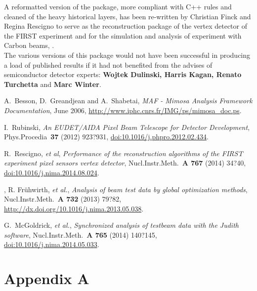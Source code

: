 \documentclass[a4paper, 12pt, twoside]{article}
\begin{document}
A reformatted version of the package, more compliant with C++ rules and cleaned of the heavy historical layers, has been re-written by Christian Finck and Regina Rescigno to serve as the reconstruction package of the vertex detector of the FIRST experiment and for the simulation and analysis of experiment with Carbon beams, \cite{}.\\

The various versions of this package would not have been successful in producing a load of published results if it had not benefited from the advises of semiconductor detector experts: {\bf Wojtek Dulinski, Harris Kagan, Renato Turchetta} and {\bf Marc Winter}.

\newpage

\begin{thebibliography}{99}

  A.~Besson, D.~Greandjean and A.~Shabetai, \emph{MAF - Mimosa Analysis Framework Documentation}, June 2006, \url{http://www.iphc.cnrs.fr/IMG/ps/mimosa_doc.ps}.

 I.~Rubinski, \emph{An EUDET/AIDA Pixel Beam Telescope for Detector Development}, Phys.Procedia~{\bf 37} (2012) 923?931, \href{http://dx.doi.org/10.1016/j.phpro.2012.02.434}{doi:10.1016/j.phpro.2012.02.434}.

  R.~Rescigno, {\it et al}, \emph{Performance of the reconstruction algorithms of the FIRST experiment pixel sensors vertex detector}, Nucl.Instr.Meth.~{\bf A 767} (2014) 34?40, \href{http://dx.doi.org/10.1016/j.nima.2014.08.024}{doi:10.1016/j.nima.2014.08.024}.

, R. Frühwirth, {\it et al.}, \emph{Analysis of beam test data by global optimization methods}, Nucl.Instr.Meth.~{\bf A 732} (2013) 79?82, \href{http://dx.doi.org/10.1016/j.nima.2013.05.038}{http://dx.doi.org/10.1016/j.nima.2013.05.038}.

 G.~McGoldrick, {\it et al.}, \emph{Synchronized analysis of testbeam data with the Judith software}, Nucl.Instr.Meth.~{\bf A 765} (2014) 140?145, \href{http://dx.doi.org/10.1016/j.nima.2014.05.033}{doi:10.1016/j.nima.2014.05.033}.

\end{thebibliography}

\newpage

\section*{Appendix A}
\label{appConfiguration}
\end{document}
